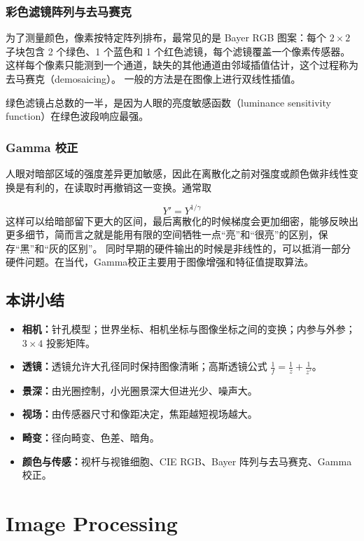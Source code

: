 \documentclass{ctexart}
\begin{document}
\subsubsection{彩色滤镜阵列与去马赛克}

为了测量颜色，像素按特定阵列排布，最常见的是 Bayer RGB 图案：每个 $2\times2$ 子块包含 2 个绿色、1 个蓝色和 1 个红色滤镜，每个滤镜覆盖一个像素传感器。这样每个像素只能测到一个通道，缺失的其他通道由邻域插值估计，这个过程称为去马赛克（demosaicing）。
一般的方法是在图像上进行双线性插值。

绿色滤镜占总数的一半，是因为人眼的亮度敏感函数（luminance sensitivity function）在绿色波段响应最强。

\subsubsection{Gamma 校正}

人眼对暗部区域的强度差异更加敏感，因此在离散化之前对强度或颜色做非线性变换是有利的，在读取时再撤销这一变换。通常取

\[
Y' = Y^{1/\gamma}
\]
这样可以给暗部留下更大的区间，最后离散化的时候梯度会更加细密，能够反映出更多细节，简而言之就是能用有限的空间牺牲一点“亮”和“很亮”的区别，保存“黑”和“灰的区别”。
同时早期的硬件输出的时候是非线性的，可以抵消一部分硬件问题。在当代，Gamma校正主要用于图像增强和特征值提取算法。

\subsection{本讲小结}

\begin{itemize}
    \item \textbf{相机：}针孔模型；世界坐标、相机坐标与图像坐标之间的变换；内参与外参；$3\times4$ 投影矩阵。
    \item \textbf{透镜：}透镜允许大孔径同时保持图像清晰；高斯透镜公式 $\frac{1}{f} = \frac{1}{z} + \frac{1}{z'}$。
    \item \textbf{景深：}由光圈控制，小光圈景深大但进光少、噪声大。
    \item \textbf{视场：}由传感器尺寸和像距决定，焦距越短视场越大。
    \item \textbf{畸变：}径向畸变、色差、暗角。
    \item \textbf{颜色与传感：}视杆与视锥细胞、CIE RGB、Bayer 阵列与去马赛克、Gamma 校正。
\end{itemize}

\section{Image Processing}
\end{document}
